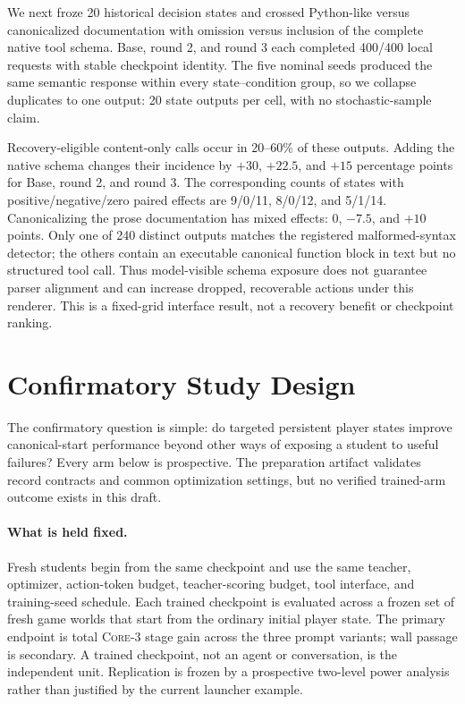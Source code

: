 \documentclass[11pt,a4paper]{article}
\newcommand{\core}{\textsc{Core-3}}
\begin{document}
We next froze 20 historical decision states and crossed Python-like versus
canonicalized documentation with omission versus inclusion of the complete
native tool schema. Base, round 2, and round 3 each completed 400/400 local
requests with stable checkpoint identity. The five nominal seeds produced the
same semantic response within every state--condition group, so we collapse
duplicates to one output: 20 state outputs per cell, with no stochastic-sample
claim.

Recovery-eligible content-only calls occur in 20--60\% of these outputs. Adding
the native schema changes their incidence by $+30$, $+22.5$, and $+15$
percentage points for Base, round 2, and round 3. The corresponding counts of
states with positive/negative/zero paired effects are 9/0/11, 8/0/12, and
5/1/14. Canonicalizing the prose documentation has mixed effects: 0, $-7.5$,
and $+10$ points. Only one of 240 distinct outputs matches the registered
malformed-syntax detector; the others contain an executable canonical function
block in text but no structured tool call. Thus model-visible schema exposure
does not guarantee parser alignment and can increase dropped, recoverable
actions under this renderer. This is a fixed-grid interface result, not a
recovery benefit or checkpoint ranking.

\section{Confirmatory Study Design}
\label{sec:confirmatory}

The confirmatory question is simple: do targeted persistent player states
improve canonical-start performance beyond other ways of exposing a student to
useful failures? Every arm below is prospective. The preparation artifact
validates record contracts and common optimization settings, but no verified
trained-arm outcome exists in this draft.

\paragraph{What is held fixed.}
Fresh students begin from the same checkpoint and use the same teacher,
optimizer, action-token budget, teacher-scoring budget, tool interface, and
training-seed schedule. Each trained checkpoint is evaluated across a frozen
set of fresh game worlds that start from the ordinary initial player state.
The primary endpoint is total \core{} stage gain across the three prompt
variants; wall passage is secondary. A trained checkpoint, not an agent or
conversation, is the independent unit. Replication is frozen by a prospective
two-level power analysis rather than justified by the current launcher example.
\end{document}
